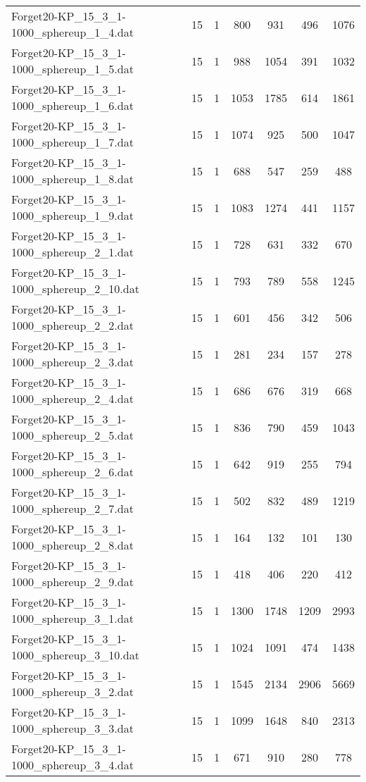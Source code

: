 \begin{table}[!ht]
\begin{tabular}{lcccccc}
Forget20-KP\_15\_3\_1-1000\_sphereup\_1\_4.dat & 15 & 1 & 800 & 931 & 496 & 1076 \\
Forget20-KP\_15\_3\_1-1000\_sphereup\_1\_5.dat & 15 & 1 & 988 & 1054 & 391 & 1032 \\
Forget20-KP\_15\_3\_1-1000\_sphereup\_1\_6.dat & 15 & 1 & 1053 & 1785 & 614 & 1861 \\
Forget20-KP\_15\_3\_1-1000\_sphereup\_1\_7.dat & 15 & 1 & 1074 & 925 & 500 & 1047 \\
Forget20-KP\_15\_3\_1-1000\_sphereup\_1\_8.dat & 15 & 1 & 688 & 547 & 259 & 488 \\
Forget20-KP\_15\_3\_1-1000\_sphereup\_1\_9.dat & 15 & 1 & 1083 & 1274 & 441 & 1157 \\
Forget20-KP\_15\_3\_1-1000\_sphereup\_2\_1.dat & 15 & 1 & 728 & 631 & 332 & 670 \\
Forget20-KP\_15\_3\_1-1000\_sphereup\_2\_10.dat & 15 & 1 & 793 & 789 & 558 & 1245 \\
Forget20-KP\_15\_3\_1-1000\_sphereup\_2\_2.dat & 15 & 1 & 601 & 456 & 342 & 506 \\
Forget20-KP\_15\_3\_1-1000\_sphereup\_2\_3.dat & 15 & 1 & 281 & 234 & 157 & 278 \\
Forget20-KP\_15\_3\_1-1000\_sphereup\_2\_4.dat & 15 & 1 & 686 & 676 & 319 & 668 \\
Forget20-KP\_15\_3\_1-1000\_sphereup\_2\_5.dat & 15 & 1 & 836 & 790 & 459 & 1043 \\
Forget20-KP\_15\_3\_1-1000\_sphereup\_2\_6.dat & 15 & 1 & 642 & 919 & 255 & 794 \\
Forget20-KP\_15\_3\_1-1000\_sphereup\_2\_7.dat & 15 & 1 & 502 & 832 & 489 & 1219 \\
Forget20-KP\_15\_3\_1-1000\_sphereup\_2\_8.dat & 15 & 1 & 164 & 132 & 101 & 130 \\
Forget20-KP\_15\_3\_1-1000\_sphereup\_2\_9.dat & 15 & 1 & 418 & 406 & 220 & 412 \\
Forget20-KP\_15\_3\_1-1000\_sphereup\_3\_1.dat & 15 & 1 & 1300 & 1748 & 1209 & 2993 \\
Forget20-KP\_15\_3\_1-1000\_sphereup\_3\_10.dat & 15 & 1 & 1024 & 1091 & 474 & 1438 \\
Forget20-KP\_15\_3\_1-1000\_sphereup\_3\_2.dat & 15 & 1 & 1545 & 2134 & 2906 & 5669 \\
Forget20-KP\_15\_3\_1-1000\_sphereup\_3\_3.dat & 15 & 1 & 1099 & 1648 & 840 & 2313 \\
Forget20-KP\_15\_3\_1-1000\_sphereup\_3\_4.dat & 15 & 1 & 671 & 910 & 280 & 778 \\

\end{tabular}
\end{table}
